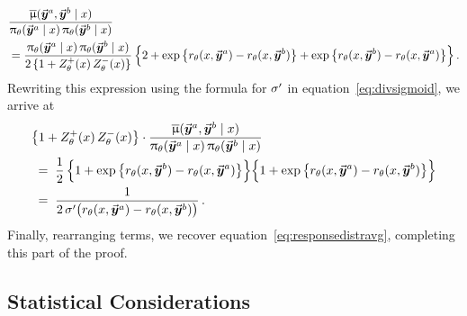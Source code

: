 		\begin{align*}
			& \frac{\responsedistravg ( \responseone, \responsetwo \mid \prompt )}{\policytheta(\responseone \mid \prompt) \, \policytheta(\responsetwo \mid \prompt)}  \\
			& = \frac{\policytheta(\responseone \mid \prompt) \, \policytheta(\responsetwo \mid \prompt)}{2 \, \{ 1 + \Partitionthetapos(\prompt) \, \Partitionthetaneg(\prompt) \}} \, \Big\{ 2 + \exp\big\{ \rewardtheta(\prompt, \responseone) - \rewardtheta(\prompt, \responsetwo) \big\} + \exp\big\{ \rewardtheta(\prompt, \responsetwo) - \rewardtheta(\prompt, \responseone) \big\} \Big\} \, .
		\end{align*}
		Rewriting this expression using the formula for $\sigma'$ in equation~\eqref{eq:divsigmoid}, we arrive at
		\begin{align*}
			& \big\{ 1 + \Partitionthetapos(\prompt) \, \Partitionthetaneg(\prompt) \big\} \cdot \frac{\responsedistravg ( \responseone, \responsetwo \mid \prompt )}{\policytheta(\responseone \mid \prompt) \, \policytheta(\responsetwo \mid \prompt)}  \\
			& \; = \; \frac{1}{2} \, \Big\{ 1 + \exp\big\{ \rewardtheta(\prompt, \responsetwo) - \rewardtheta(\prompt, \responseone) \big\} \Big\}  \Big\{ 1 + \exp\big\{ \rewardtheta(\prompt, \responseone) - \rewardtheta(\prompt, \responsetwo) \big\} \Big\}  \\
			& \; = \; \frac{1}{2 \, \divsigmoid \big( \rewardtheta(\prompt, \responseone) - \rewardtheta(\prompt, \responsetwo) \big)} \, .
		\end{align*}
		Finally, rearranging terms, we recover equation~\eqref{eq:responsedistravg}, completing this part of the proof.


	\subsection{Statistical Considerations \yaqidone}
	\label{sec:proof:thm:stat}



